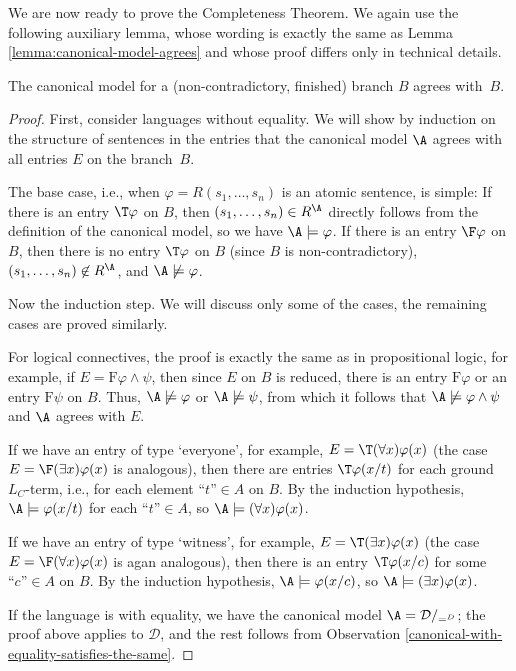 We are now ready to prove the Completeness Theorem. We again use the following auxiliary lemma, whose wording is exactly the same as Lemma \ref{lemma:canonical-model-agrees} and whose proof differs only in technical details.

\begin{lemma}\label{lemma:canonical-model-agrees-predicate}
    The canonical model for a (non-contradictory, finished) branch $B$ agrees with~$B$.
\end{lemma}
\begin{proof}
First, consider languages without equality. We will show by induction on the structure of sentences in the entries that the canonical model $\A$ agrees with all entries $E$ on the branch~$B$. 

The base case, i.e., when $\varphi=R(s_1,\dots,s_n)$ is an atomic sentence, is simple: If there is an entry $\T\varphi$ on $B$, then $(s_1,\dots,s_n)\in R^\A$ directly follows from the definition of the canonical model, so we have $\A\models\varphi$. If there is an entry $\F\varphi$ on $B$, then there is no entry $\T\varphi$ on $B$ (since $B$ is non-contradictory), $(s_1,\dots,s_n)\not\in R^\A$, and $\A\not\models\varphi$.

Now the induction step. We will discuss only some of the cases, the remaining cases are proved similarly. 

For logical connectives, the proof is exactly the same as in propositional logic, for example, if $E=\mathrm{F}\varphi\land\psi$, then since $E$ on $B$ is reduced, there is an entry $\mathrm{F}\varphi$ or an entry $\mathrm{F}\psi$ on $B$. Thus, $\A\not\models\varphi$ or $\A\not\models\psi$, from which it follows that $\A\not\models\varphi\land\psi$ and $\A$ agrees with $E$.

If we have an entry of type `everyone', for example, $E=\T(\forall x)\varphi(x)$ 
(the case $E=\F(\exists x)\varphi(x)$ is analogous), then there are entries $\T\varphi(x/t)$ for each ground $L_C$-term, i.e., for each element $\text{``$t$''}\in A$ on $B$. By the induction hypothesis, $\A\models\varphi(x/t)$ for each $\text{``$t$''}\in A$, so $\A\models(\forall x)\varphi(x)$.

If we have an entry of type `witness', for example, $E=\T(\exists x)\varphi(x)$ 
(the case $E=\F(\forall x)\varphi(x)$ is agan analogous), then there is an entry $\T\varphi(x/c)$ for some $\text{``$c$''}\in A$ on $B$. By the induction hypothesis, $\A\models\varphi(x/c)$, so $\A\models(\exists x)\varphi(x)$.

If the language is with equality, we have the canonical model $\A=\mathcal D/_{=^D}$; the proof above applies to $\mathcal D$, and the rest follows from Observation \ref{canonical-with-equality-satisfies-the-same}.
\end{proof}

